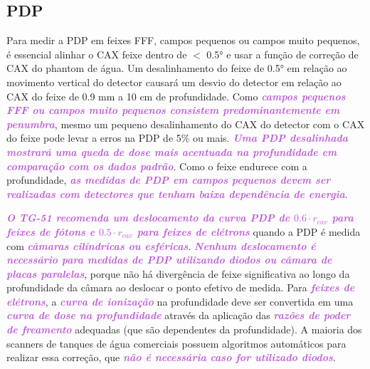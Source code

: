 \documentclass[11pt,a4paper]{article}
\begin{document}
\subsection*{PDP}

	Para medir a PDP em feixes FFF, campos pequenos ou campos muito pequenos, é essencial alinhar o CAX feixe dentro de $<$ \ang{0.5} e usar a função de correção de CAX do phantom de água. Um desalinhamento do feixe de \ang{0.5} em relação ao movimento vertical do detector causará um desvio do detector em relação ao CAX do feixe de 0.9 mm a 10 cm de profundidade. Como \textcolor{MediumOrchid}{\textbf{\textit{campos pequenos FFF ou campos muito pequenos consistem predominantemente em penumbra}}}, mesmo um pequeno desalinhamento do CAX do detector com o CAX do feixe pode levar a erros na PDP de 5\% ou mais. \textcolor{MediumOrchid}{\textbf{\textit{Uma PDP desalinhada mostrará uma queda de dose mais acentuada na profundidade em comparação com os dados padrão}}}. Como o feixe endurece com a profundidade, \textcolor{MediumOrchid}{\textbf{\textit{as medidas de PDP em campos pequenos devem ser realizadas com detectores que tenham baixa dependência de energia}}}.

	\textcolor{MediumOrchid}{\textbf{\textit{O TG-51 recomenda um deslocamento da curva PDP de $0.6 \cdot r_{cav}$ para feixes de fótons e $0.5 \cdot r_{cav}$ para feixes de elétrons}}} quando a PDP é medida com \textcolor{MediumOrchid}{\textbf{\textit{câmaras cilíndricas ou esféricas}}}. \textcolor{MediumOrchid}{\textbf{\textit{Nenhum deslocamento é necessário para medidas de PDP utilizando diodos ou câmara de placas paralelas}}}, porque não há divergência de feixe significativa ao longo da profundidade da câmara ao deslocar o ponto efetivo de medida. Para \textcolor{MediumOrchid}{\textbf{\textit{feixes de elétrons}}}, a \textcolor{MediumOrchid}{\textbf{\textit{curva de ionização}}} na profundidade deve ser convertida em uma \textcolor{MediumOrchid}{\textbf{\textit{curva de dose na profundidade}}} através da aplicação das \textcolor{MediumOrchid}{\textbf{\textit{razões de poder de freamento}}} adequadas (que são dependentes da profundidade). A maioria dos scanners de tanques de água comerciais possuem algoritmos automáticos para realizar essa correção, que \textcolor{MediumOrchid}{\textbf{\textit{não é necessária caso for utilizado diodos}}}.
\end{document}
